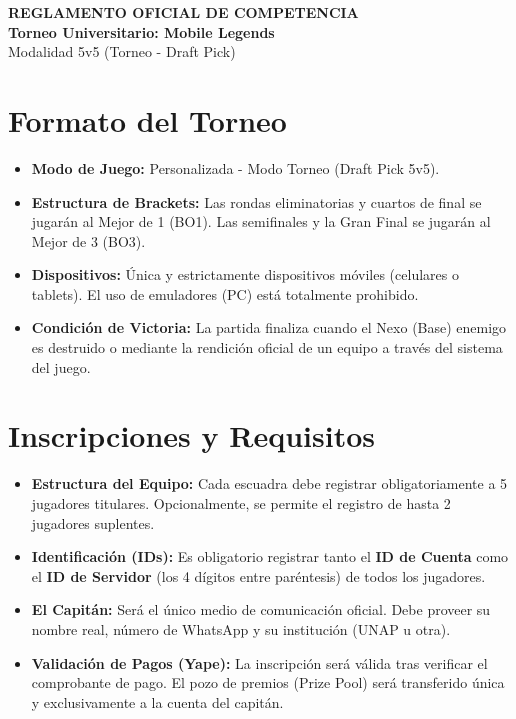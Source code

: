\documentclass[11pt, a4paper]{article}
\begin{document}
\begin{center}
    {\Large \textbf{REGLAMENTO OFICIAL DE COMPETENCIA}}\\[0.5cm]
    {\huge \textbf{Torneo Universitario: Mobile Legends}}\\[0.2cm]
    {\large Modalidad 5v5 (Torneo - Draft Pick)}
\end{center}

\vspace{1cm}

\section{Formato del Torneo}
\begin{itemize}
    \item \textbf{Modo de Juego:} Personalizada - Modo Torneo (Draft Pick 5v5).
    \item \textbf{Estructura de Brackets:} Las rondas eliminatorias y cuartos de final se jugarán al Mejor de 1 (BO1). Las semifinales y la Gran Final se jugarán al Mejor de 3 (BO3).
    \item \textbf{Dispositivos:} Única y estrictamente dispositivos móviles (celulares o tablets). El uso de emuladores (PC) está totalmente prohibido.
    \item \textbf{Condición de Victoria:} La partida finaliza cuando el Nexo (Base) enemigo es destruido o mediante la rendición oficial de un equipo a través del sistema del juego.
\end{itemize}

\section{Inscripciones y Requisitos}
\begin{itemize}
    \item \textbf{Estructura del Equipo:} Cada escuadra debe registrar obligatoriamente a 5 jugadores titulares. Opcionalmente, se permite el registro de hasta 2 jugadores suplentes.
    \item \textbf{Identificación (IDs):} Es obligatorio registrar tanto el \textbf{ID de Cuenta} como el \textbf{ID de Servidor} (los 4 dígitos entre paréntesis) de todos los jugadores.
    \item \textbf{El Capitán:} Será el único medio de comunicación oficial. Debe proveer su nombre real, número de WhatsApp y su institución (UNAP u otra).
    \item \textbf{Validación de Pagos (Yape):} La inscripción será válida tras verificar el comprobante de pago. El pozo de premios (Prize Pool) será transferido única y exclusivamente a la cuenta del capitán.
\end{itemize}
\end{document}
